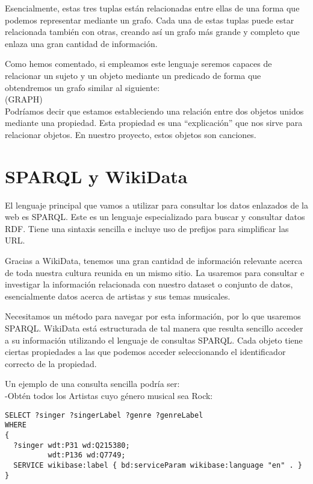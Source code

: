 Esencialmente, estas tres tuplas están relacionadas entre ellas de una forma que podemos representar mediante un grafo. Cada una de estas tuplas puede estar relacionada también con otras, creando así un grafo más grande y completo que enlaza una gran cantidad de información.

Como hemos comentado, si empleamos este lenguaje seremos capaces de relacionar un sujeto y un objeto mediante un predicado de forma que obtendremos un grafo similar al siguiente:\\

(GRAPH)\\

Podríamos decir que estamos estableciendo una relación entre dos objetos unidos mediante una propiedad. Esta propiedad es una ``explicación'' que nos sirve para relacionar objetos. En nuestro proyecto, estos objetos son canciones.

\section{SPARQL y WikiData}

El lenguaje principal que vamos a utilizar para consultar los datos enlazados de la web es SPARQL. Este es un lenguaje especializado para buscar y consultar datos RDF. Tiene una sintaxis sencilla e incluye uso de prefijos para simplificar las URL.

Gracias a WikiData, tenemos una gran cantidad de información relevante acerca de toda nuestra cultura reunida en un mismo sitio. La usaremos para consultar e investigar la información relacionada con nuestro dataset o conjunto de datos, esencialmente datos acerca de artistas y sus temas musicales.

Necesitamos un método para navegar por esta información, por lo que usaremos SPARQL. WikiData está estructurada de tal manera que resulta sencillo acceder a su información utilizando el lenguaje de consultas SPARQL. Cada objeto tiene ciertas propiedades a las que podemos acceder seleccionando el identificador correcto de la propiedad.

Un ejemplo de una consulta sencilla podría ser:\\

-Obtén todos los Artistas cuyo género musical sea Rock:\\

\begin{lstlisting}[language=SPARQL]
SELECT ?singer ?singerLabel ?genre ?genreLabel
WHERE
{
  ?singer wdt:P31 wd:Q215380;
      	  wdt:P136 wd:Q7749;
  SERVICE wikibase:label { bd:serviceParam wikibase:language "en" . }
}
\end{lstlisting}

